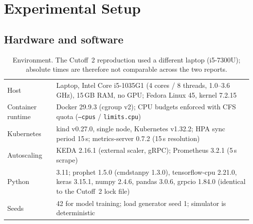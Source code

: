 \documentclass[11pt,a4paper]{article}
\begin{document}
\section{Experimental Setup}
\subsection{Hardware and software}
\begin{table}[H]\centering\small
\begin{tabularx}{\textwidth}{@{}lL@{}}\toprule
Host & Laptop, Intel Core i5-1035G1 (4 cores / 8 threads, 1.0--3.6\,GHz), 15\,GB RAM, no GPU; Fedora Linux 45, kernel 7.2.15 \\
Container runtime & Docker 29.9.3 (cgroup v2); CPU budgets enforced with CFS quota (\texttt{--cpus} / \texttt{limits.cpu}) \\
Kubernetes & kind v0.27.0, single node, Kubernetes v1.32.2; HPA sync period 15\,s; metrics-server 0.7.2 (15\,s resolution) \\
Autoscaling & KEDA 2.16.1 (external scaler, gRPC); Prometheus 3.2.1 (5\,s scrape) \\
Python & 3.11; prophet 1.5.0 (cmdstanpy 1.3.0), tensorflow-cpu 2.21.0, keras 3.15.1, numpy 2.4.6, pandas 3.0.6, grpcio 1.84.0 (identical to the Cutoff~2 lock file) \\
Seeds & 42 for model training; load generator seed 1; simulator is deterministic \\
\bottomrule\end{tabularx}
\caption{Environment. The Cutoff~2 reproduction used a different laptop (i5-7300U); absolute times are therefore not comparable across the two reports.}
\end{table}
\end{document}
